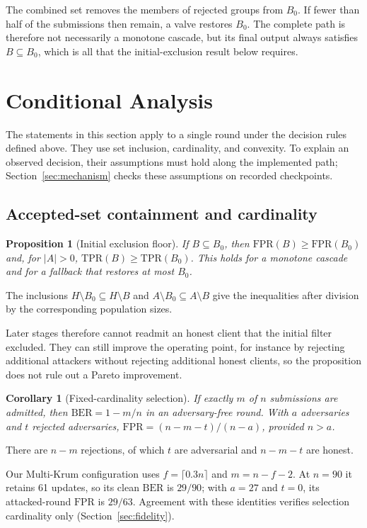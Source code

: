 \documentclass[journal]{IEEEtran}
\newtheorem{proposition}{Proposition}
\newtheorem{corollary}{Corollary}
\newcommand{\BER}{\mathrm{BER}}
\begin{document}
The combined set removes the members of rejected groups from $B_0$. If fewer than half of the submissions then remain, a valve restores $B_0$. The complete path is therefore not necessarily a monotone cascade, but its final output always satisfies $B\subseteq B_0$, which is all that the initial-exclusion result below requires.

\section{Conditional Analysis}\label{sec:theory}
The statements in this section apply to a single round under the decision rules defined above. They use set inclusion, cardinality, and convexity. To explain an observed decision, their assumptions must hold along the implemented path; Section~\ref{sec:mechanism} checks these assumptions on recorded checkpoints.

\subsection{Accepted-set containment and cardinality}
\begin{proposition}[Initial exclusion floor]\label{prop:floor}
If $B\subseteq B_0$, then $\mathrm{FPR}(B)\geq\mathrm{FPR}(B_0)$ and, for $|A|>0$, $\mathrm{TPR}(B)\geq\mathrm{TPR}(B_0)$. This holds for a monotone cascade and for a fallback that restores at most $B_0$.
\end{proposition}
\begin{IEEEproof}
The inclusions $H\setminus B_0\subseteq H\setminus B$ and $A\setminus B_0\subseteq A\setminus B$ give the inequalities after division by the corresponding population sizes.
\end{IEEEproof}
Later stages therefore cannot readmit an honest client that the initial filter excluded. They can still improve the operating point, for instance by rejecting additional attackers without rejecting additional honest clients, so the proposition does not rule out a Pareto improvement.

\begin{corollary}[Fixed-cardinality selection]\label{cor:cardinality}
If exactly $m$ of $n$ submissions are admitted, then $\BER=1-m/n$ in an adversary-free round. With $a$ adversaries and $t$ rejected adversaries, $\mathrm{FPR}=(n-m-t)/(n-a)$, provided $n>a$.
\end{corollary}
\begin{IEEEproof}
There are $n-m$ rejections, of which $t$ are adversarial and $n-m-t$ are honest.
\end{IEEEproof}
Our Multi-Krum configuration uses $f=\lceil0.3n\rceil$ and $m=n-f-2$. At $n=90$ it retains 61 updates, so its clean $\BER$ is $29/90$; with $a=27$ and $t=0$, its attacked-round $\mathrm{FPR}$ is $29/63$. Agreement with these identities verifies selection cardinality only (Section~\ref{sec:fidelity}).
\end{document}
